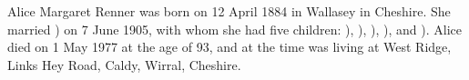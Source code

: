 
Alice Margaret Renner was born on 12 April 1884 in Wallasey in Cheshire.\cite{UKCensus1911_RG14_22074} She married ) on 7 June 1905\cite{CheshireParishRegisters}, with whom she had five children: ), ), ), ), and ). 
Alice died on 1 May 1977 at the age of 93, and at the time was living at West Ridge, Links Hey Road, Caldy, Wirral, Cheshire. \cite{AMRennerDeath} 
